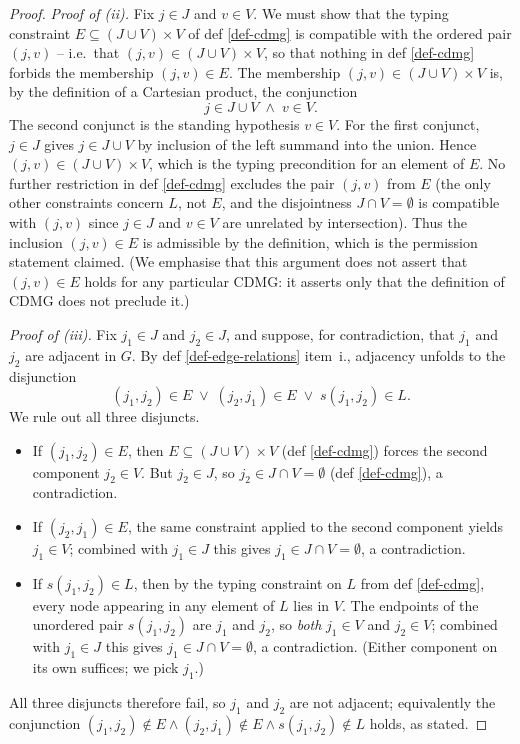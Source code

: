 \documentclass[main]{subfiles}
\begin{document}
\begin{proof}
\medskip
\emph{Proof of (ii).}
Fix $j \in J$ and $v \in V$. We must show that the typing constraint $E \subseteq (J \cup V) \times V$ of def \ref{def-cdmg} is compatible with the ordered pair $(j, v)$ -- i.e.\ that $(j, v) \in (J \cup V) \times V$, so that nothing in def \ref{def-cdmg} forbids the membership $(j, v) \in E$. The membership $(j, v) \in (J \cup V) \times V$ is, by the definition of a Cartesian product, the conjunction
\[ j \in J \cup V \;\land\; v \in V. \]
The second conjunct is the standing hypothesis $v \in V$. For the first conjunct, $j \in J$ gives $j \in J \cup V$ by inclusion of the left summand into the union. Hence $(j, v) \in (J \cup V) \times V$, which is the typing precondition for an element of $E$. No further restriction in def \ref{def-cdmg} excludes the pair $(j, v)$ from $E$ (the only other constraints concern $L$, not $E$, and the disjointness $J \cap V = \emptyset$ is compatible with $(j, v)$ since $j \in J$ and $v \in V$ are unrelated by intersection). Thus the inclusion $(j, v) \in E$ is admissible by the definition, which is the permission statement claimed. (We emphasise that this argument does not assert that $(j, v) \in E$ holds for any particular CDMG: it asserts only that the definition of CDMG does not preclude it.)

\medskip
\emph{Proof of (iii).}
Fix $j_1 \in J$ and $j_2 \in J$, and suppose, for contradiction, that $j_1$ and $j_2$ are adjacent in $G$. By def \ref{def-edge-relations} item~i., adjacency unfolds to the disjunction
\[ (j_1, j_2) \in E \;\lor\; (j_2, j_1) \in E \;\lor\; s(j_1, j_2) \in L. \]
We rule out all three disjuncts.
\begin{itemize}
    \item If $(j_1, j_2) \in E$, then $E \subseteq (J \cup V) \times V$ (def \ref{def-cdmg}) forces the second component $j_2 \in V$. But $j_2 \in J$, so $j_2 \in J \cap V = \emptyset$ (def \ref{def-cdmg}), a contradiction.
    \item If $(j_2, j_1) \in E$, the same constraint applied to the second component yields $j_1 \in V$; combined with $j_1 \in J$ this gives $j_1 \in J \cap V = \emptyset$, a contradiction.
    \item If $s(j_1, j_2) \in L$, then by the typing constraint on $L$ from def \ref{def-cdmg}, every node appearing in any element of $L$ lies in $V$. The endpoints of the unordered pair $s(j_1, j_2)$ are $j_1$ and $j_2$, so \emph{both} $j_1 \in V$ and $j_2 \in V$; combined with $j_1 \in J$ this gives $j_1 \in J \cap V = \emptyset$, a contradiction. (Either component on its own suffices; we pick $j_1$.)
\end{itemize}
All three disjuncts therefore fail, so $j_1$ and $j_2$ are not adjacent; equivalently the conjunction $(j_1, j_2) \notin E \land (j_2, j_1) \notin E \land s(j_1, j_2) \notin L$ holds, as stated.


\end{proof}
\end{document}
